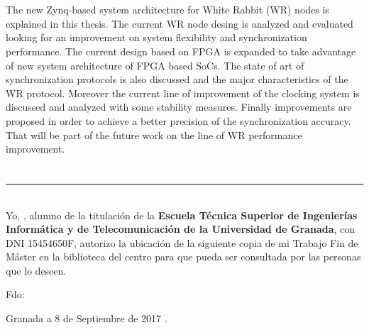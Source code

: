 \\

\vspace{0.7cm}
\\

The new Zynq-based system architecture for White Rabbit (WR) nodes is explained 
in this thesis. The current WR node desing is analyzed and evaluated looking 
for an improvement on system flexibility and synchronization performance. The 
current design based on FPGA is expanded to take advantage of new system 
architecture of FPGA based SoCs. The state of art of synchronization protocols 
is also discussed and the major characteristics of the WR protocol. Moreover 
the current line of improvement of the clocking system is discussed and 
analyzed with some stability measures. Finally improvements are proposed in 
order to achieve a better precision of the synchronization accuracy. That will 
be part of the future work on the line of WR performance improvement.


\chapter*{}
\thispagestyle{empty}

\noindent\rule[-1ex]{\textwidth}{2pt}\\[4.5ex]

Yo, \textbf{\myName}, alumno de la titulación \myDegree de la \textbf{Escuela 
Técnica Superior
de Ingenierías Informática y de Telecomunicación de la Universidad de Granada}, con DNI 15454650F, autorizo la
ubicación de la siguiente copia de mi Trabajo Fin de Máster en la biblioteca 
del centro para que pueda ser consultada por las personas que lo deseen.

\vspace{6cm}

\noindent Fdo: \myName

\vspace{2cm}

\begin{flushright}
Granada a 8 de Septiembre de 2017 .
\end{flushright}


\chapter*{}
\thispagestyle{empty}

